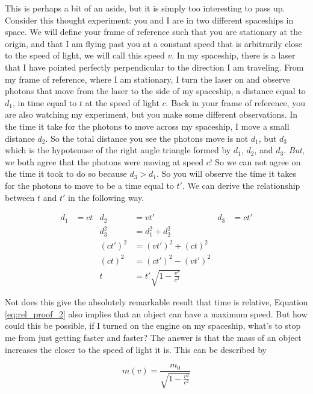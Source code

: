 \documentclass[12pt]{report}
\begin{document}
This is perhaps a bit of an aside, but it is simply too interesting to pass up. Consider this thought experiment: you and I are in two different spaceships in space. We will define your frame of reference such that you are stationary at the origin, and that I am flying past you at a constant speed that is arbitrarily close to the speed of light, we will call this speed $v$. In my spaceship, there is a laser that I have pointed perfectly perpendicular to the direction I am traveling. From my frame of reference, where I am stationary, I turn the laser on and observe photons that move from the laser to the side of my spaceship, a distance equal to $d_{1}$, in time equal to $t$ at the speed of light $c$. Back in your frame of reference, you are also watching my experiment, but you make some different observations. In the time it take for the photons to move across my spaceship, I move a small distance $d_{2}$. So the total distance you see the photons move is not $d_{1}$, but $d_{3}$ which is the hypotenuse of the right angle triangle formed by $d_{1}$, $d_{2}$, and $d_{3}$. \textit{But}, we both agree that the photons were moving at speed $c$! So we can not agree on the time it took to do so because $d_{3} > d_{1}$. So you will observe the time it takes for the photons to move to be a time equal to $t'$. We can derive the relationship between $t$ and $t'$ in the following way.

\begin{align}
\label{eq:rel_proof}
d_{1} &	= ct	&	d_{2} &	= vt'	&	d_{3} &	=ct'	\\
&&	d_{3}^{2}	&	=d_{1}^{2}+d_{2}^{2}		\\
&&	(ct')^{2}	&	=(vt')^{2} + (ct)^{2}	\\
&&	(ct)^{2}	&	=(ct')^{2} - (vt')^{2}	\\
&&	t	&	=t'\sqrt{1 - \frac{v^{2}}{c^{2}}}
\label{eq:rel_proof_2}
\end{align} 

Not does this give the absolutely remarkable result that time is relative, Equation \ref{eq:rel_proof_2} also implies that an object can have a maximum speed. But how could this be possible, if I turned on the engine on my spaceship, what's to stop me from just getting faster and faster? The answer is that the mass of an object increases the closer to the speed of light it is. This can be described by\cite{Piela}
 
\begin{equation}
\label{eq:rel_mass}
m(v) = \frac{m_{0}}{\sqrt{1 - \frac{v^{2}}{c^{2}}}}
\end{equation}
\end{document}
